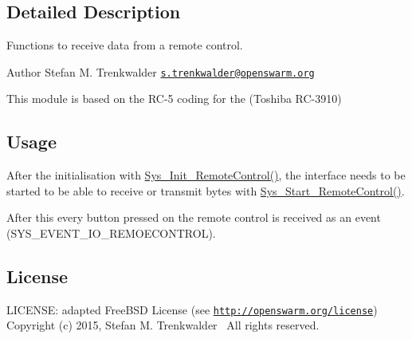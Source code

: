 \subsection{Detailed Description}
Functions to receive data from a remote control. 

\begin{DoxyAuthor}{Author}
Stefan M. Trenkwalder \href{mailto:s.trenkwalder@openswarm.org}{\tt s.\+trenkwalder@openswarm.\+org}
\end{DoxyAuthor}
This module is based on the R\+C-\/5 coding for the (Toshiba R\+C-\/3910)\hypertarget{group__remotecontrol_rc_usage}{}\subsection{Usage}\label{group__remotecontrol_rc_usage}
After the initialisation with \hyperlink{remoteControl_8h_a3265e493859892f6ebca8df6252d6f8e}{Sys\+\_\+\+Init\+\_\+\+Remote\+Control()}, the interface needs to be started to be able to receive or transmit bytes with \hyperlink{remoteControl_8h_a5aaecc26aad6d1c545a225b1ce92cec7}{Sys\+\_\+\+Start\+\_\+\+Remote\+Control()}.

After this every button pressed on the remote control is received as an event (S\+Y\+S\+\_\+\+E\+V\+E\+N\+T\+\_\+\+I\+O\+\_\+\+R\+E\+M\+O\+E\+C\+O\+N\+T\+R\+O\+L).\hypertarget{group__remotecontrol_rc_license}{}\subsection{License}\label{group__remotecontrol_rc_license}
L\+I\+C\+E\+N\+S\+E\+: adapted Free\+B\+S\+D License (see \href{http://openswarm.org/license}{\tt http\+://openswarm.\+org/license})~\newline
Copyright (c) 2015, Stefan M. Trenkwalder~\newline
All rights reserved. 